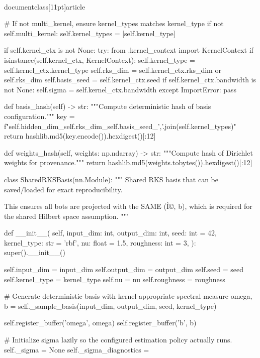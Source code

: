\\documentclass[11pt]{article}
\begin{document}
\begin{CodeBlock}
        # If not multi_kernel, ensure kernel_types matches kernel_type
        if not self.multi_kernel:
            self.kernel_types = [self.kernel_type]
        
        if self.kernel_ctx is not None:
            try:
                from .kernel_context import KernelContext
                if isinstance(self.kernel_ctx, KernelContext):
                    self.kernel_type = self.kernel_ctx.kernel_type
                    self.rks_dim = self.kernel_ctx.rks_dim or self.rks_dim
                    self.basis_seed = self.kernel_ctx.seed
                    if self.kernel_ctx.bandwidth is not None:
                        self.sigma = self.kernel_ctx.bandwidth
            except ImportError:
                pass
    
    def basis_hash(self) -> str:
        """Compute deterministic hash of basis configuration."""
        key = f"{self.hidden_dim}_{self.rks_dim}_{self.basis_seed}_{','.join(self.kernel_types)}"
        return hashlib.md5(key.encode()).hexdigest()[:12]
    
    def weights_hash(self, weights: np.ndarray) -> str:
        """Compute hash of Dirichlet weights for provenance."""
        return hashlib.md5(weights.tobytes()).hexdigest()[:12]


class SharedRKSBasis(nn.Module):
    """
    Shared RKS basis that can be saved/loaded for exact reproducibility.
    
    This ensures all bots are projected with the SAME (Î©, b),
    which is required for the shared Hilbert space assumption.
    """
    
    def __init__(
        self,
        input_dim: int,
        output_dim: int,
        seed: int = 42,
        kernel_type: str = 'rbf',
        nu: float = 1.5,
        roughness: int = 3,
    ):
        super().__init__()

        self.input_dim = input_dim
        self.output_dim = output_dim
        self.seed = seed
        self.kernel_type = kernel_type
        self.nu = nu
        self.roughness = roughness

        # Generate deterministic basis with kernel-appropriate spectral measure
        omega, b = self._sample_basis(input_dim, output_dim, seed, kernel_type)

        self.register_buffer('omega', omega)
        self.register_buffer('b', b)

        # Initialize sigma lazily so the configured estimation policy actually runs.
        self._sigma = None
        self._sigma_diagnostics = {}


\end{CodeBlock}
\end{document}
